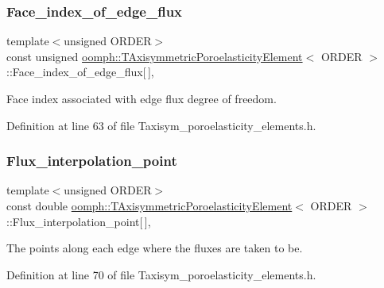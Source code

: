 \subsubsection{\texorpdfstring{Face\+\_\+index\+\_\+of\+\_\+edge\+\_\+flux}{Face\_index\_of\_edge\_flux}}
{\footnotesize\ttfamily template$<$unsigned O\+R\+D\+ER$>$ \\
const unsigned \hyperlink{classoomph_1_1TAxisymmetricPoroelasticityElement}{oomph\+::\+T\+Axisymmetric\+Poroelasticity\+Element}$<$ O\+R\+D\+ER $>$\+::Face\+\_\+index\+\_\+of\+\_\+edge\+\_\+flux\mbox{[}$\,$\mbox{]}\hspace{0.3cm}{\ttfamily [static]}, {\ttfamily [private]}}



Face index associated with edge flux degree of freedom. 



Definition at line 63 of file Taxisym\+\_\+poroelasticity\+\_\+elements.\+h.

\mbox{\label{classoomph_1_1TAxisymmetricPoroelasticityElement_a84ede53b1b2d295bb379e43ed6f40782}} 
\subsubsection{\texorpdfstring{Flux\+\_\+interpolation\+\_\+point}{Flux\_interpolation\_point}}
{\footnotesize\ttfamily template$<$unsigned O\+R\+D\+ER$>$ \\
const double \hyperlink{classoomph_1_1TAxisymmetricPoroelasticityElement}{oomph\+::\+T\+Axisymmetric\+Poroelasticity\+Element}$<$ O\+R\+D\+ER $>$\+::Flux\+\_\+interpolation\+\_\+point\mbox{[}$\,$\mbox{]}\hspace{0.3cm}{\ttfamily [static]}, {\ttfamily [private]}}



The points along each edge where the fluxes are taken to be. 



Definition at line 70 of file Taxisym\+\_\+poroelasticity\+\_\+elements.\+h.

\mbox{\label{classoomph_1_1TAxisymmetricPoroelasticityElement_a518f29c851f4062f3ef1b94f0076a902}} 
